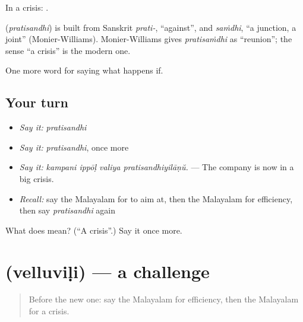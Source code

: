 In a crisis: .

\begin{cousinweb}
\textbf{} (\emph{pratisandhi}) is built from Sanskrit \emph{prati-}, \textquotedblleft{}against\textquotedblright{}, and \emph{saṁdhi}, \textquotedblleft{}a junction, a joint\textquotedblright{} (Monier-Williams). Monier-Williams gives \emph{pratisaṁdhi} as \textquotedblleft{}reunion\textquotedblright{}; the sense \textquotedblleft{}a crisis\textquotedblright{} is the modern one.
\end{cousinweb}

\begin{grammarlens}[title={What you've built}]
One more word for saying what happens if.
\end{grammarlens}

\subsection*{Your turn}
\begin{itemize}
\raggedright
  \item \emph{Say it:} \emph{pratisandhi}
  \item \emph{Say it:} \emph{pratisandhi}, once more
  \item \emph{Say it:} \emph{kampani ippōḷ valiya pratisandhiyilāṇŭ.} — The company is now in a big crisis.
  \item \emph{Recall:} say the Malayalam for to aim at, then the Malayalam for efficiency, then say \emph{pratisandhi} again
\end{itemize}

\begin{tcolorbox}[breakable,colback=teal!4,colframe=teal!35!black,title={Before you move on}]
What does  mean? (\textquotedblleft{}A crisis\textquotedblright{}.) Say it once more.
\end{tcolorbox}
\section[\texorpdfstring{\ml{വെല്ലുവിളി} (velluviḷi)}{വെല്ലുവിളി (velluviḷi)}]{ (velluviḷi) — a challenge}

\label{lesson:ML-C448-velluvili}



\begin{quote}
Before the new one: say the Malayalam for efficiency, then the Malayalam for a crisis.
\end{quote}

